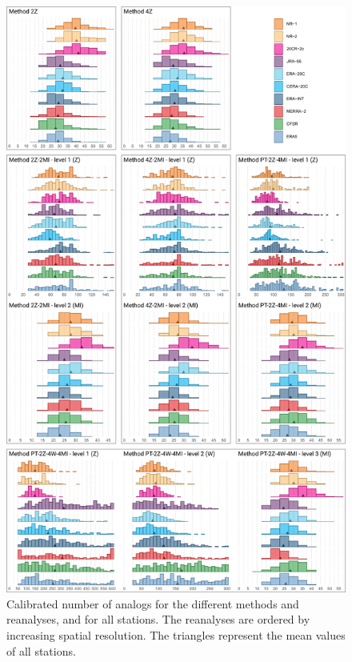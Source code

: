 \documentclass[alpha-refs]{wiley-article}
\begin{document}
\begin{figure}[btp]
	\centering
	\includegraphics[width=115mm]{figure-6.pdf}
	\caption{Calibrated number of analogs for the different methods and reanalyses, and for all stations. The reanalyses are ordered by increasing spatial resolution. The triangles represent the mean values of all stations.}
	\label{fig:params-nb-analogs}
\end{figure}
\end{document}
